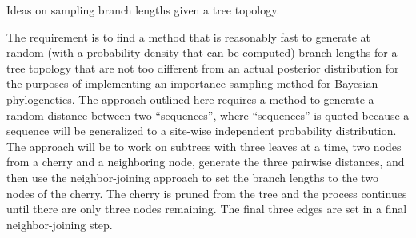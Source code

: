 \documentclass[12pt,letterpaper]{article}
\begin{document}
\begin{center}
Ideas on sampling branch lengths given a tree topology.
\end{center}

The requirement is to find a method that is reasonably fast
to generate at random (with a probability density that can be computed)
branch lengths for a tree topology that are not too different from an actual posterior distribution
for the purposes of implementing an importance sampling method for Bayesian phylogenetics.
The approach outlined here requires a method to generate a random distance between two ``sequences'',
where ``sequences'' is quoted because a sequence will be generalized to a site-wise independent probability distribution.
The approach will be to work on subtrees with three leaves at a time,
two nodes from a cherry and a neighboring node,
generate the three pairwise distances,
and then use the neighbor-joining approach to set the branch lengths to the two nodes of the cherry.
The cherry is pruned from the tree and the process continues until there are only three nodes remaining.
The final three edges are set in a final neighbor-joining step.
\end{document}
